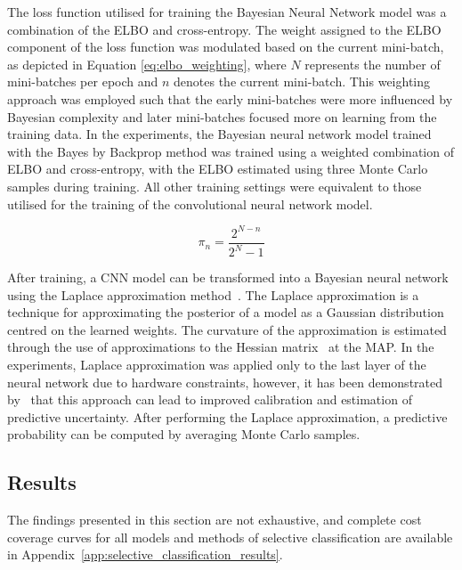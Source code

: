 The loss function utilised for training the Bayesian Neural Network model was a combination of the ELBO and cross-entropy. The weight assigned to the ELBO component of the loss function was modulated based on the current mini-batch, as depicted in Equation \ref{eq:elbo_weighting}, where $N$ represents the number of mini-batches per epoch and $n$ denotes the current mini-batch. This weighting approach was employed such that the early mini-batches were more influenced by Bayesian complexity and later mini-batches focused more on learning from the training data. In the experiments, the Bayesian neural network model trained with the Bayes by Backprop method was trained using a weighted combination of ELBO and cross-entropy, with the ELBO estimated using three Monte Carlo samples during training. All other training settings were equivalent to those utilised for the training of the convolutional neural network model.

\begin{equation}
	\pi_n = \frac{2^{N-n}}{2^N-1}
	\label{eq:elbo_weighting}
\end{equation}

After training, a CNN model can be transformed into a Bayesian neural network using the Laplace approximation method~\citep{mackay1992bayesian}. The Laplace approximation is a technique for approximating the posterior of a model as a Gaussian distribution centred on the learned weights. The curvature of the approximation is estimated through the use of approximations to the Hessian matrix~\citep{botev2017practical} at the MAP. In the experiments, Laplace approximation was applied only to the last layer of the neural network due to hardware constraints, however, it has been demonstrated by~\cite{kristiadi2020being} that this approach can lead to improved calibration and estimation of predictive uncertainty. After performing the Laplace approximation, a predictive probability can be computed by averaging Monte Carlo samples.


\subsection{Results}
The findings presented in this section are not exhaustive, and complete cost coverage curves for all models and methods of selective classification are available in Appendix~\ref{app:selective_classification_results}.


